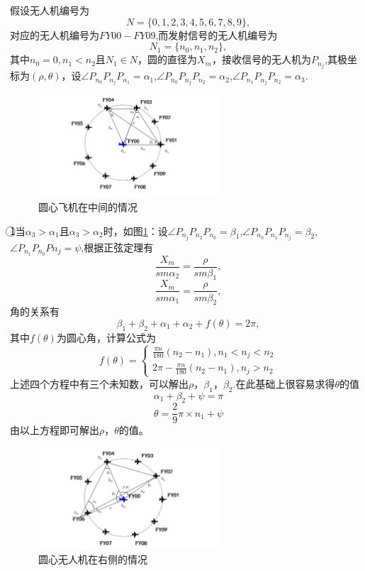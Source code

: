 \documentclass[withoutpreface,bwprint]{cumcmthesis} %
\begin{document}
	假设无人机编号为$$N=\{0,1,2,3,4,5,6,7,8,9\},$$对应的无人机编号为$FY00-FY09$,而发射信号的无人机编号为$$N_1=\{ n_{0},n_{1},n_{2} \},$$其中$n_0=0,n_1<n_2$且$N_1\in N$，圆的直径为$X_m$，接收信号的无人机为$P_{n_j}$,其极坐标为$(\rho,\theta)$，设$\angle P_{n_0} P_{n_j} P_{n_1}=\alpha_1$,$\angle P_{n_0} P_{n_j} P_{n_2}=\alpha_2$,$\angle P_{n_1}P_{n_j}P_{n_2}=\alpha_3.$
	\begin{figure}[H]
		\centering
		\includegraphics[width=0.6\textwidth]{1}
		\caption{圆心飞机在中间的情况}
		\label{1}
	\end{figure}
	\textcircled{1}当$\alpha_3>\alpha_1$且$\alpha_3>\alpha_2$时，如图\ref{1}：设$\angle P_{n_j}P_{n_2}P_{n_0}=\beta_1$,$\angle P_{n_0}P_{n_1}P_{n_j}=\beta_2$,$\angle P_{n_1}P_{n_0}P{n_j}=\psi$,根据正弦定理有
	$$\frac{X_m}{sm\alpha_2}=\frac{\rho}{sm\beta_1},$$ 
	$$\frac{X_m}{sm\alpha_1}=\frac{\rho}{sm\beta_2},$$
	角的关系有
	$$\beta_1 +\beta_2 +\alpha_1+\alpha_2+f(\theta )=2\pi,$$ 
	其中$f(\theta )$为圆心角，计算公式为
	$$f(\theta)=\left\{\begin{matrix} 
	\frac{\pi n}{180} (n_2-n_1),n_1<n_j<n_2  \\  
	2\pi-\frac{\pi n}{180} (n_2-n_1),n_j>n_2
	\end{matrix}\right.$$   
	上述四个方程中有三个未知数，可以解出$\rho$，$\beta_1$，$\beta_2$.在此基础上很容易求得$\theta$的值
	$$\alpha_1+\beta_2+\psi=\pi$$
	$$\theta=\frac{2}{9} \pi \times n_1+\psi $$ 
	由以上方程即可解出$\rho$，$\theta$的值。
	\begin{figure}[H]
		\centering
		\includegraphics[width=0.6\textwidth]{2}
		\caption{圆心无人机在右侧的情况}
		\label{2}
	\end{figure}
\end{document}
